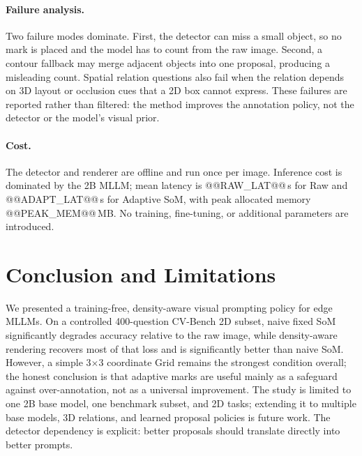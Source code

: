 \documentclass[10pt,twocolumn]{article}
\begin{document}
\paragraph{Failure analysis.}
Two failure modes dominate. First, the detector can miss a small object, so no mark is placed and the model has to count from the raw image. Second, a contour fallback may merge adjacent objects into one proposal, producing a misleading count. Spatial relation questions also fail when the relation depends on 3D layout or occlusion cues that a 2D box cannot express. These failures are reported rather than filtered: the method improves the annotation policy, not the detector or the model's visual prior.

\paragraph{Cost.}
The detector and renderer are offline and run once per image. Inference cost is dominated by the 2B MLLM; mean latency is @@RAW_LAT@@\,s for Raw and @@ADAPT_LAT@@\,s for Adaptive SoM, with peak allocated memory @@PEAK_MEM@@\,MB. No training, fine-tuning, or additional parameters are introduced.

\section{Conclusion and Limitations}
\label{sec:conclusion}
We presented a training-free, density-aware visual prompting policy for edge MLLMs. On a controlled 400-question CV-Bench 2D subset, naive fixed SoM significantly degrades accuracy relative to the raw image, while density-aware rendering recovers most of that loss and is significantly better than naive SoM. However, a simple 3$\times$3 coordinate Grid remains the strongest condition overall; the honest conclusion is that adaptive marks are useful mainly as a safeguard against over-annotation, not as a universal improvement. The study is limited to one 2B base model, one benchmark subset, and 2D tasks; extending it to multiple base models, 3D relations, and learned proposal policies is future work. The detector dependency is explicit: better proposals should translate directly into better prompts.



\end{document}
